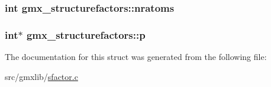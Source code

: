 \hypertarget{structgmx__structurefactors_a9be28e731045287fcdd7df2180660386}{
\subsubsection[{nratoms}]{\setlength{\rightskip}{0pt plus 5cm}int {\bf gmx\-\_\-structurefactors\-::nratoms}}}\label{structgmx__structurefactors_a9be28e731045287fcdd7df2180660386}
\hypertarget{structgmx__structurefactors_ac14c3f98a9135147f69efcef7b70018d}{
\subsubsection[{p}]{\setlength{\rightskip}{0pt plus 5cm}int$\ast$ {\bf gmx\-\_\-structurefactors\-::p}}}\label{structgmx__structurefactors_ac14c3f98a9135147f69efcef7b70018d}


\-The documentation for this struct was generated from the following file\-:\begin{DoxyCompactItemize}
\item 
src/gmxlib/\hyperlink{sfactor_8c}{sfactor.\-c}\end{DoxyCompactItemize}
